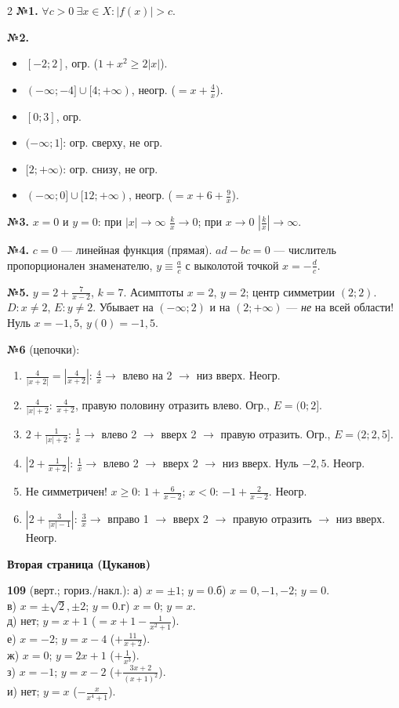 \documentclass[11pt]{extarticle}
\begin{document}
\begin{multicols}{2}
\textbf{№1.} $\forall c>0\ \exists x\in X\colon |f(x)|>c$.

\textbf{№2.}
\begin{itemize}
\item[А)] $[-2;2]$, огр. ($1+x^2\ge2|x|$).
\item[Б)] $(-\infty;-4]\cup[4;+\infty)$, неогр. ($=x+\frac4x$).
\item[В)] $[0;3]$, огр.
\item[Г)] $(-\infty;1]$: огр. сверху, не огр.
\item[Д)] $[2;+\infty)$: огр. снизу, не огр.
\item[Е)] $(-\infty;0]\cup[12;+\infty)$, неогр. ($=x+6+\frac9x$).
\end{itemize}

\textbf{№3.} $x=0$ и $y=0$: при $|x|\to\infty$ $\frac kx\to0$; при $x\to0$ $\left|\frac kx\right|\to\infty$.

\textbf{№4.} $c=0$ — линейная функция (прямая). $ad-bc=0$ — числитель пропорционален знаменателю, $y\equiv\frac ac$ с выколотой точкой $x=-\frac dc$.

\textbf{№5.} $y=2+\frac{7}{x-2}$, $k=7$. Асимптоты $x=2$, $y=2$; центр симметрии $(2;2)$. $D\colon x\ne2$, $E\colon y\ne2$. Убывает на $(-\infty;2)$ и на $(2;+\infty)$ — \emph{не} на всей области! Нуль $x=-1{,}5$, $y(0)=-1{,}5$.

\textbf{№6} (цепочки):
\begin{enumerate}[label=\arabic*)]
\item $\frac4{|x+2|}=\left|\frac4{x+2}\right|$: $\frac4x\to$ влево на 2 $\to$ низ вверх. Неогр.
\item $\frac4{|x|+2}$: $\frac4{x+2}$, правую половину отразить влево. Огр., $E=(0;2]$.
\item $2+\frac1{|x|+2}$: $\frac1x\to$ влево 2 $\to$ вверх 2 $\to$ правую отразить. Огр., $E=(2;2{,}5]$.
\item $\left|2+\frac1{x+2}\right|$: $\frac1x\to$ влево 2 $\to$ вверх 2 $\to$ низ вверх. Нуль $-2{,}5$. Неогр.
\item Не симметричен! $x\ge0$: $1+\frac6{x-2}$; $x<0$: $-1+\frac2{x-2}$. Неогр.
\item $\left|2+\frac3{|x|-1}\right|$: $\frac3x\to$ вправо 1 $\to$ вверх 2 $\to$ правую отразить $\to$ низ вверх. Неогр.
\end{enumerate}

\columnbreak
{\sffamily\bfseries Вторая страница (Цуканов)}

\textbf{109} (верт.; гориз./накл.):
а) $x=\pm1$; $y=0$.\quad б) $x=0,-1,-2$; $y=0$.\\
в) $x=\pm\sqrt2,\pm2$; $y=0$.\quad г) $x=0$; $y=x$.\\
д) нет; $y=x+1$ ($=x+1-\frac1{x^2+1}$).\\
е) $x=-2$; $y=x-4$ ($+\frac{11}{x+2}$).\\
ж) $x=0$; $y=2x+1$ ($+\frac1{x^3}$).\\
з) $x=-1$; $y=x-2$ ($+\frac{3x+2}{(x+1)^2}$).\\
и) нет; $y=x$ ($-\frac{x}{x^4+1}$).


\end{multicols}
\end{document}
